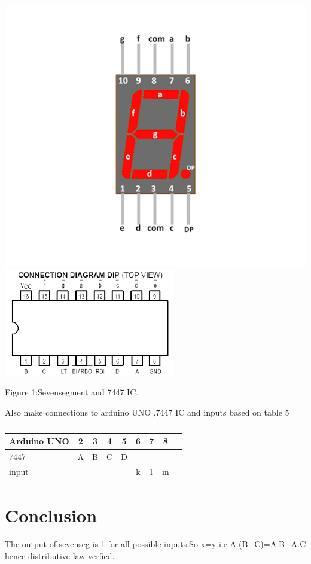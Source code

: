 \documentclass[10pt, a4paper]{article}
\begin{document}
\begin{center}

\includegraphics[scale=.20]{lcde.png}
\includegraphics[scale=.20]{7447.png}


\end{center}
Figure 1:Sevensegment and 7447 IC.

Also make connections to arduino UNO ,7447 IC and inputs based on table 5

\begin{table}[htbp]
 \begin{center}
    \begin{tabular}{|l|c|c|c|c|c|c|c|c} \hline \textbf{Arduino UNO}
  & \textbf{2} & \textbf{3} & \textbf{4}& \textbf{5}& \textbf{6}& \textbf{7}& \textbf{8} \\
 \hline
7447&A&B&C&D&&& \\ \hline
input&&&&&k&l&m \\ \hline

\end{tabular}   
\end{center}
\caption{\label{table:dummytable} }
\end{table}
\section{Conclusion}
The output of sevenseg  is 1 for all possible inputs.So x=y i.e  A.(B+C)=A.B+A.C hence distributive law verfied.
\end{document}
